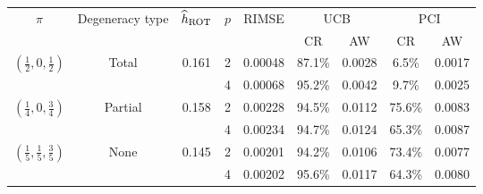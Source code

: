 \begin{center}
    \begin{tabular}{|c|c|c|c|c|cc|cc|}
        \hline
        \multirow{2}{*}{$ \pi $}
        & \multirow{2}{*}{Degeneracy type}
        & \multirow{2}{*}{$ \widehat h_{\operatorname{ROT}} $}
        & \multirow{2}{*}{$ p $}
        & \multirow{2}{*}{RIMSE}
        & \multicolumn{2}{|c|}{UCB}
        & \multicolumn{2}{|c|}{PCI} \\
        \cline{6-9}
        & & & &
        & CR & AW
        & CR & AW \\
        \hline
\multirow{2}{*}{$ \left(\frac{1}{2}, 0, \frac{1}{2}\right) $}
& \multirow{2}{*}{Total}
& \multirow{2}{*}{0.161}
 & 2 & 0.00048 & 87.1\% & 0.0028 & 6.5\% & 0.0017 \\
 & &  & 4 & 0.00068 & 95.2\% & 0.0042 & 9.7\% & 0.0025 \\
\hline
\multirow{2}{*}{$ \left(\frac{1}{4}, 0, \frac{3}{4}\right) $}
& \multirow{2}{*}{Partial}
& \multirow{2}{*}{0.158}
 & 2 & 0.00228 & 94.5\% & 0.0112 & 75.6\% & 0.0083 \\
 & &  & 4 & 0.00234 & 94.7\% & 0.0124 & 65.3\% & 0.0087 \\
\hline
\multirow{2}{*}{$ \left(\frac{1}{5}, \frac{1}{5}, \frac{3}{5}\right) $}
& \multirow{2}{*}{None}
& \multirow{2}{*}{0.145}
 & 2 & 0.00201 & 94.2\% & 0.0106 & 73.4\% & 0.0077 \\
 & &  & 4 & 0.00202 & 95.6\% & 0.0117 & 64.3\% & 0.0080 \\
\hline
\end{tabular}
\end{center}
